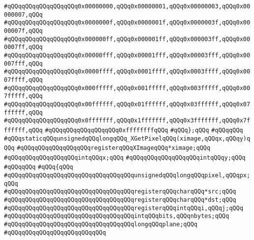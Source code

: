 \verb|#qQQqqQQqqQQqqQQqqQQq0x00000000,qQQq0x00000001,qQQq0x00000003,qQQq0x00000007,qQQq|\newline
\verb|#qQQqqQQqqQQqqQQqqQQq0x0000000f,qQQq0x0000001f,qQQq0x0000003f,qQQq0x0000007f,qQQq|\newline
\verb|#qQQqqQQqqQQqqQQqqQQq0x000000ff,qQQq0x000001ff,qQQq0x000003ff,qQQq0x000007ff,qQQq|\newline
\verb|#qQQqqQQqqQQqqQQqqQQq0x00000fff,qQQq0x00001fff,qQQq0x00003fff,qQQq0x00007fff,qQQq|\newline
\verb|#qQQqqQQqqQQqqQQqqQQq0x0000ffff,qQQq0x0001ffff,qQQq0x0003ffff,qQQq0x0007ffff,qQQq|\newline
\verb|#qQQqqQQqqQQqqQQqqQQq0x000fffff,qQQq0x001fffff,qQQq0x003fffff,qQQq0x007fffff,qQQq|\newline
\verb|#qQQqqQQqqQQqqQQqqQQq0x00ffffff,qQQq0x01ffffff,qQQq0x03ffffff,qQQq0x07ffffff,qQQq|\newline
\verb|#qQQqqQQqqQQqqQQqqQQq0x0fffffff,qQQq0x1fffffff,qQQq0x3fffffff,qQQq0x7fffffff,qQQq|\newline
\verb|#qQQqqQQqqQQqqQQqqQQq0xffffffffqQQq|\newline
\verb|#qQQq};qQQq|\newline
\verb|#qQQqqQQq|\newline
\verb|#qQQqstaticqQQqunsignedqQQqlongqQQq_XGetPixelqQQq(ximage,qQQqx,qQQqy)qQQq|\newline
\verb|#qQQqqQQqqQQqqQQqqQQqregisterqQQqXImageqQQq*ximage;qQQq|\newline
\verb|#qQQqqQQqqQQqqQQqqQQqintqQQqx;qQQq|\newline
\verb|#qQQqqQQqqQQqqQQqqQQqintqQQqy;qQQq|\newline
\verb|#qQQqqQQq|\newline
\verb|#qQQq{qQQq|\newline
\verb|#qQQqqQQqqQQqqQQqqQQqqQQqqQQqqQQqqQQqunsignedqQQqlongqQQqpixel,qQQqpx;qQQq|\newline
\verb|#qQQqqQQqqQQqqQQqqQQqqQQqqQQqqQQqqQQqregisterqQQqcharqQQq*src;qQQq|\newline
\verb|#qQQqqQQqqQQqqQQqqQQqqQQqqQQqqQQqqQQqregisterqQQqcharqQQq*dst;qQQq|\newline
\verb|#qQQqqQQqqQQqqQQqqQQqqQQqqQQqqQQqqQQqregisterqQQqintqQQqi,qQQqj;qQQq|\newline
\verb|#qQQqqQQqqQQqqQQqqQQqqQQqqQQqqQQqqQQqintqQQqbits,qQQqnbytes;qQQq|\newline
\verb|#qQQqqQQqqQQqqQQqqQQqqQQqqQQqqQQqqQQqlongqQQqplane;qQQq|\newline
\verb|#qQQqqQQqqQQqqQQqqQQqqQQqqQQq|\newline
